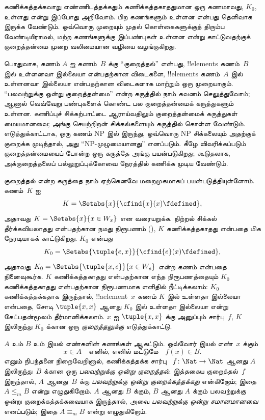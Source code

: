 \documentclass[../../../include/open-logic-section]{subfiles}
\begin{document}


\begin{explain}
கணிக்கத்தக்கவாறு எண்ணிடத்தக்கதும் கணிக்கத்தகாததுமான ஒரு கணமாவது,
$K_0$, உள்ளது என்று இப்போது அறிவோம். பிற கணங்களும் உள்ளன என்பது
தெளிவாக இருக்க வேண்டும். ஒவ்வொரு முறையும் முதல் கொள்கைகளுக்குத்
திரும்ப வேண்டியிராமல், மற்ற கணங்களுக்கு இப்பண்புகள் உள்ளன என்று
காட்டுவதற்குக் குறைத்தன்மை முறை வலிமையான வழியை வழங்குகிறது.

பொதுவாக, கணம் $A$ ஐ கணம்~$B$ க்கு ``குறைத்தல்'' என்பது,
!!{element}s கணம்~$B$ இல் உள்ளனவா இல்லையா என்பதற்கான விடைகளை,
!!{element}s கணம்~$A$ இல் உள்ளனவா இல்லையா என்பதற்கான விடைகளாக
மாற்றும் ஒரு முறையாகும். ``பலவற்றுக்கு ஒன்று குறைத்தன்மை''
என்ற கருத்தில் நாம் கவனம் செலுத்துவோம்; ஆனால் வெவ்வேறு பண்புகளைக்
கொண்ட பல குறைத்தன்மைக் கருத்துகளும் உள்ளன. கணிப்புச் சிக்கற்பாட்டை
ஆராய்வதிலும் குறைத்தன்மைக் கருத்துகள் மையமானவை; அங்கு செயற்றிறன்
சிக்கல்களையும் கருத்தில் கொள்ள வேண்டும். எடுத்துக்காட்டாக, ஒரு கணம்
NP இல் இருந்து, ஒவ்வொரு NP சிக்கலையும் அதற்குக் குறைக்க முடிந்தால்,
அது ``NP-முழுமையானது'' எனப்படும். கீழே விவரிக்கப்படும்
குறைத்தன்மையைப் போன்ற ஒரு கருத்தே அங்கு பயன்படுகிறது; கூடுதலாக,
அக்குறைத்தலைப் பல்லுறுப்புக்கோவை நேரத்தில் கணிக்க முடிய வேண்டும்.

குறைத்தல் என்ற கருத்தை நாம் ஏற்கெனவே மறைமுகமாகப் பயன்படுத்தியுள்ளோம்.
கணம்~$K$ ஐ
\[
K = \Setabs{x}{\cfind{x}(x) \fdefined},
\]
அதாவது $K = \Setabs{x}{x \in W_x}$ என வரையறுக்க. நிற்றல் சிக்கல்
தீர்க்கவியலாதது என்பதற்கான நமது நிரூபணம்
(), $K$ கணிக்கத்தகாதது என்பதை
மிக நேரடியாகக் காட்டுகிறது. $K_0$ என்பது
\[
K_0 = \Setabs{\tuple{e, x}}{\cfind{e}(x) \fdefined },
\]
அதாவது $K_0 = \Setabs{\tuple{x,e}}{x \in W_e}$ என்ற கணம் என்பதை
நினைவுகூர்க. $K$ கணிக்கத்தகாதது என்பதற்கான எந்த நிரூபணத்தையும்
$K_0$ கணிக்கத்தகாதது என்பதற்கான நிரூபணமாக எளிதில் நீட்டிக்கலாம்:
$K_0$ கணிக்கத்தக்கதாக இருந்தால், !!a{element}~$x$ கணம் $K$ இல்
உள்ளதா இல்லையா என்பதை, சோடி $\tuple{x, x}$ ஆனது $K_0$ இல்
உள்ளதா இல்லையா என்று கேட்பதன்மூலம் தீர்மானிக்கலாம். $x$ ஐ
$\tuple{x, x}$ க்கு அனுப்பும் சார்பு~$f$, $K$ இலிருந்து $K_0$
க்கான ஒரு \emph{குறைத்தலுக்கு} எடுத்துக்காட்டு.
\end{explain}

\begin{defn}
$A$ உம் $B$ உம் இயல் எண்களின் கணங்கள் ஆகட்டும். ஒவ்வோர் இயல்
எண்~$x$ க்கும்
\[
x \in A \quad \text{எனில், எனில் மட்டுமே} \quad f(x) \in B.
\]
எனும் நிபந்தனை நிறைவேறினால், கணிக்கத்தக்க சார்பு
~$f\colon \Nat \to \Nat$ ஆனது $A$ இலிருந்து~$B$ க்கான ஒரு
\emph{பலவற்றுக்கு ஒன்று குறைத்தல்}. இத்தகைய குறைத்தல்~$f$ இருந்தால்,
$A$ ஆனது~$B$ க்கு \emph{பலவற்றுக்கு ஒன்று குறைக்கத்தக்கது} என்கிறோம்;
இதை $A \leq_m B$ என்று எழுதுகிறோம். $A$ ஆனது $B$ க்கும், $B$ ஆனது
$A$ க்கும் பலவற்றுக்கு ஒன்று குறைக்கத்தக்கவையாக இருந்தால், அவை
\emph{பலவற்றுக்கு ஒன்று சமானமானவை} எனப்படும்; இதை
$A \equiv_m B$ என்று எழுதுகிறோம்.
\end{defn}
\end{document}
